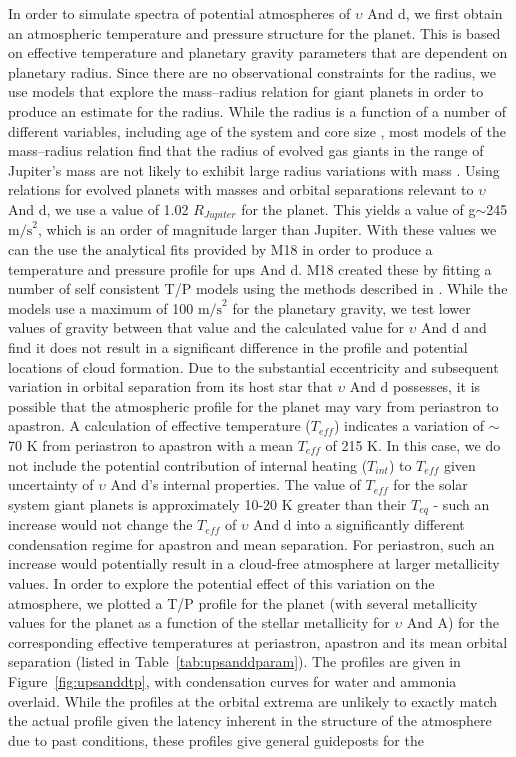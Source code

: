 \documentclass[12pt, letterpaper]{aastex631}
\begin{document}
In order to simulate spectra of potential atmospheres of $\upsilon$ And d, we first obtain an atmospheric temperature and pressure structure for the planet.  This is based on effective temperature and planetary gravity parameters that are dependent on planetary radius.  Since there are no observational constraints for the radius, we use models that explore the mass--radius relation for giant planets in order to produce an estimate for the radius.  While the radius is a function of a number of different variables, including age of the system and core size \citep{2007ApJ...659.1661F, 2008ApJ...683.1104F}, most models of the mass--radius relation find that the radius of evolved gas giants in the range of Jupiter's mass are not likely to exhibit large radius variations with mass \citep{2017A&A...604A..83B}.  Using relations \citep{2007ApJ...659.1661F, 2008ApJ...683.1104F} for evolved planets with masses and orbital separations relevant to $\upsilon$ And d, we use a value of 1.02 $R_{Jupiter}$ for the planet.  This yields a value of g$\sim$245 $\text{m/s}^{2}$, which is an order of magnitude larger than Jupiter.  With these values we can the use the analytical fits provided by M18 in order to produce a temperature and pressure profile for ups And d.  M18 created these by fitting a number of self consistent T/P models using the methods described in \textcite{2008ApJ...683.1104F}.  While the models use a maximum of 100 $\text{m/s}^{2}$ for the planetary gravity, we test lower values of gravity between that value and the calculated value for $\upsilon$ And d and find it does not result in a significant difference in the profile and potential locations of cloud formation. Due to the substantial eccentricity and subsequent variation in orbital separation from its host star that $\upsilon$ And d possesses, it is possible that the atmospheric profile for the planet may vary from periastron to apastron.  A calculation of effective temperature ($T_{eff}$) indicates a variation of $\sim$70 K from periastron to apastron with a mean $T_{eff}$ of 215 K.  In this case, we do not include the potential contribution of internal heating ($T_{int}$) to $T_{eff}$ given uncertainty of $\upsilon$ And d's internal properties. The value of $T_{eff}$ for the solar system giant planets is approximately 10-20 K greater than their $T_{eq}$ - such an increase would not change the $T_{eff}$ of $\upsilon$ And d into a significantly different condensation regime for apastron and mean separation. For periastron, such an increase would potentially result in a cloud-free atmosphere at larger metallicity values.  In order to explore the potential effect of this variation on the atmosphere, we plotted a T/P profile for the planet (with several metallicity values for the planet as a function of the stellar metallicity for $\upsilon$ And A) for the corresponding effective temperatures at periastron, apastron and its mean orbital separation (listed in Table~\ref{tab:upsanddparam}).  The profiles are given in Figure~\ref{fig:upsanddtp}, with condensation curves for water and ammonia overlaid.  While the profiles at the orbital extrema are unlikely to exactly match the actual profile given the latency inherent in the structure of the atmosphere due to past conditions,  these profiles give general guideposts for the 
\end{document}
